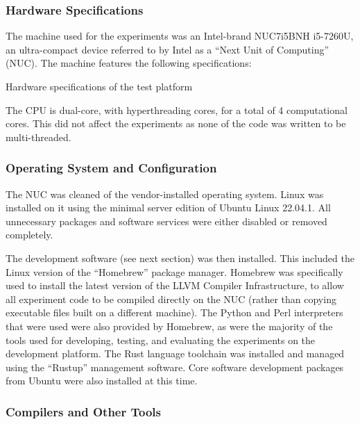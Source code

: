 \subsubsection{Hardware Specifications}

The machine used for the experiments was an Intel-brand NUC7i5BNH i5-7260U, an ultra-compact device referred to by Intel as a ``Next Unit of Computing'' (NUC). The machine features the following specifications:

\begin{table}[h!]
\begin{center}

\caption{Hardware specifications of the test platform}
\end{center}
\label{table:hardware_specs}
\end{table}

The CPU is dual-core, with hyperthreading cores, for a total of 4 computational cores. This did not affect the experiments as none of the code was written to be multi-threaded.

\subsubsection{Operating System and Configuration}

The NUC was cleaned of the vendor-installed operating system. Linux was installed on it using the minimal server edition of Ubuntu Linux 22.04.1. All unnecessary packages and software services were either disabled or removed completely.

The development software (see next section) was then installed. This included the Linux version of the ``Homebrew'' package manager. Homebrew was specifically used to install the latest version of the LLVM Compiler Infrastructure, to allow all experiment code to be compiled directly on the NUC (rather than copying executable files built on a different machine). The Python and Perl interpreters that were used were also provided by Homebrew, as were the majority of the tools used for developing, testing, and evaluating the experiments on the development platform. The Rust language toolchain was installed and managed using the ``Rustup'' management software. Core software development packages from Ubuntu were also installed at this time.

\subsubsection{Compilers and Other Tools}

